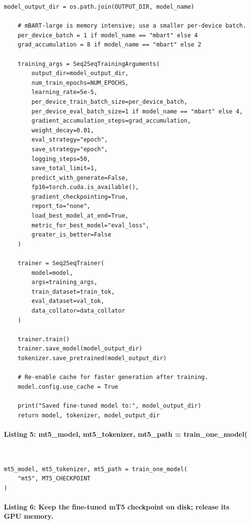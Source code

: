 \documentclass[12pt,a4paper,oneside]{report}
\begin{document}
\begin{Verbatim}[commandchars=\\\{\},breaklines=true,breakanywhere=true,fontsize=\scriptsize,frame=leftline,framesep=2mm,rulecolor=\color{gray}]
    model_output_dir = os.path.join(OUTPUT_DIR, model_name)

    # mBART-large is memory intensive; use a smaller per-device batch.
    per_device_batch = 1 if model_name == "mbart" else 4
    grad_accumulation = 8 if model_name == "mbart" else 2

    training_args = Seq2SeqTrainingArguments(
        output_dir=model_output_dir,
        num_train_epochs=NUM_EPOCHS,
        learning_rate=5e-5,
        per_device_train_batch_size=per_device_batch,
        per_device_eval_batch_size=1 if model_name == "mbart" else 4,
        gradient_accumulation_steps=grad_accumulation,
        weight_decay=0.01,
        eval_strategy="epoch",
        save_strategy="epoch",
        logging_steps=50,
        save_total_limit=1,
        predict_with_generate=False,
        fp16=torch.cuda.is_available(),
        gradient_checkpointing=True,
        report_to="none",
        load_best_model_at_end=True,
        metric_for_best_model="eval_loss",
        greater_is_better=False
    )

    trainer = Seq2SeqTrainer(
        model=model,
        args=training_args,
        train_dataset=train_tok,
        eval_dataset=val_tok,
        data_collator=data_collator
    )

    trainer.train()
    trainer.save_model(model_output_dir)
    tokenizer.save_pretrained(model_output_dir)

    # Re-enable cache for faster generation after training.
    model.config.use_cache = True

    print("Saved fine-tuned model to:", model_output_dir)
    return model, tokenizer, model_output_dir
\end{Verbatim}
\paragraph{Listing 5: mt5\_model, mt5\_tokenizer, mt5\_path = train\_one\_model(}\mbox{}\\[-1ex]
\begin{Verbatim}[commandchars=\\\{\},breaklines=true,breakanywhere=true,fontsize=\scriptsize,frame=leftline,framesep=2mm,rulecolor=\color{gray}]
mt5_model, mt5_tokenizer, mt5_path = train_one_model(
    "mt5", MT5_CHECKPOINT
)
\end{Verbatim}
\paragraph{Listing 6: Keep the fine-tuned mT5 checkpoint on disk; release its GPU memory.}\mbox{}\\[-1ex]
\end{document}
